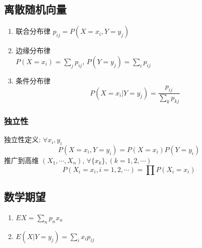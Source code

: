 \documentclass[11pt,a4paper,twocolumn]{article} %
\numberwithin{equation}{section} %
\begin{document}
\subsection{离散随机向量} %
\label{sub:multi_dim}
\begin{enumerate}
	\item 联合分布律 $p_{ij} = P(X=x_i, Y=y_j)$
	\item 边缘分布律\\
	$P(X=x_i) = \sum_j p_{ij}$, 
	$P(Y=y_j) = \sum_i p_{ij}$
	\item 条件分布律
	\begin{equation}
		P(X=x_i|Y=y_j) = \frac{p_{ij}}{\sum_k p_{kj}}
	\end{equation}
\end{enumerate}
\subsubsection{独立性} %
\label{ssub:indenpendency_discrete}
独立性定义: $\forall x_i, y_i$
\begin{equation}
	P(X=x_i, Y=y_i) = P(X=x_i)P(Y=y_i)
\end{equation}
推广到高维 $(X_1, \cdots, X_n)$, $\forall \{x_k\}, (k = 1,2,\cdots)$
\begin{equation}
	P(X_i = x_i, i=1,2,\cdots) = \prod P(X_i = x_i)
\end{equation}
\subsection{数学期望} %
\label{sub:math_chara_discrete}
\begin{enumerate}
	\item $EX =  \sum_n p_n x_n$
	\item $E(X|Y=y_j) = \sum_i x_i p_{ij}$
\end{enumerate}
\end{document}
